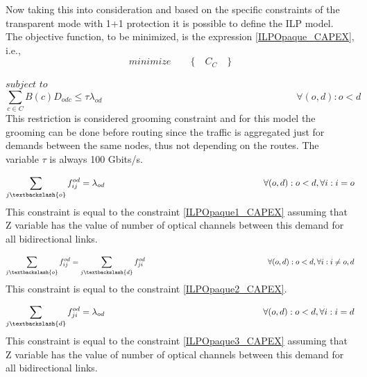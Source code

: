 Now taking this into consideration and based on the specific constraints of the transparent mode with 1+1 protection it is possible to define the ILP model.\\
\newpage
The objective function, to be minimized, is the expression \ref{ILPOpaque_CAPEX}, i.e.,
\begin{equation*}
  minimize \qquad \Big\{ \quad C_C \quad \Big\}
\end{equation*}

$subject$ $to$
\begin{equation}
\sum_{c\in C} B\left(c\right) D_{odc} \leq \tau \lambda_{od} \qquad \qquad \qquad \qquad \qquad \qquad \qquad \qquad \qquad \qquad
\forall(o,d) : o < d
\label{ILPTransp0}
\end{equation}
\noindent
This restriction is considered grooming constraint and for this model the grooming can be done before routing since the traffic is aggregated just for demands between the same nodes, thus not depending on the routes. The variable  $\tau$ is always 100 Gbits/s.

\begin{equation}
\sum_{j\textbackslash \{o\}} f_{ij}^{od} = \lambda_{od} \qquad \qquad \qquad \qquad \qquad \qquad \qquad \qquad \qquad
\forall(o,d) : o < d, \forall i: i = o
\label{ILPTransp1}
\end{equation}
\noindent
This constraint is equal to the constraint \ref{ILPOpaque1_CAPEX} assuming that Z variable has the value of number of optical channels between this demand for all bidirectional links.

\begin{equation}
\sum_{j\textbackslash \{o\}} f_{ij}^{od} = \sum_{j\textbackslash \{d\}} f_{ji}^{od} \qquad \qquad \qquad \qquad \qquad \qquad \qquad \qquad
\forall(o,d) : o < d, \forall i: i \neq o,d
\label{ILPTransp2}
\end{equation}
\noindent
This constraint is equal to the constraint \ref{ILPOpaque2_CAPEX}.

\begin{equation}
\sum_{j\textbackslash \{d\}} f_{ji}^{od} = \lambda_{od}  \qquad \qquad \qquad \qquad \qquad \qquad \qquad \qquad \qquad
\forall(o,d) : o < d, \forall i: i = d
\label{ILPTransp3}
\end{equation}
\noindent
This constraint is equal to the constraint \ref{ILPOpaque3_CAPEX} assuming that Z variable has the value of number of optical channels between this demand for all bidirectional links.

